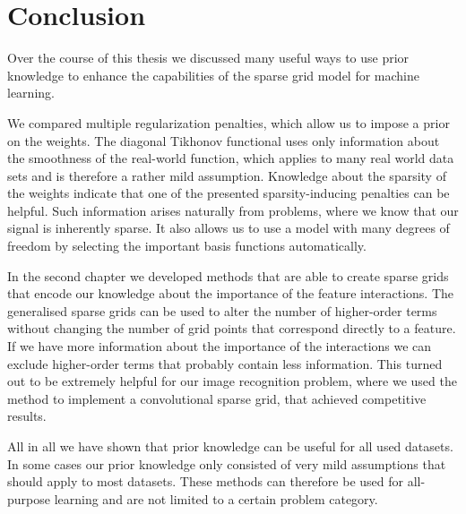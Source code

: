 
\chapter{Conclusion}
\label{chap:conclusion}
Over the course of this thesis we discussed many useful ways to use prior
knowledge to enhance the capabilities of the sparse grid model for machine
learning.

We compared multiple regularization penalties, which allow us to impose a prior
on the weights.
The diagonal Tikhonov functional uses only information about the smoothness of
the real-world function, which applies to many real world data sets and is
therefore a rather mild assumption.
Knowledge about the sparsity of the weights indicate that one of the presented
sparsity-inducing penalties can be helpful.
Such information arises naturally from problems, where we know that our signal
is inherently sparse.
It also allows us to use a model with many degrees of freedom by selecting the
important basis functions automatically.

In the second chapter we developed methods that are able to create sparse grids
that encode our knowledge about the importance of the feature interactions.
The generalised sparse grids can be used to alter the number of higher-order
terms without changing the number of grid points that correspond directly to a
feature.
If we have more information about the importance of the interactions we can
exclude higher-order terms that probably contain less information.
This turned out to be extremely helpful for our image recognition problem, where
we used the method to implement a convolutional sparse grid, that achieved
competitive results.

All in all we have shown that prior knowledge can be useful for all used
datasets.
In some cases our prior knowledge only consisted of very mild assumptions that
should apply to most datasets.
These methods can therefore be used for all-purpose learning and are not limited
to a certain problem category.



